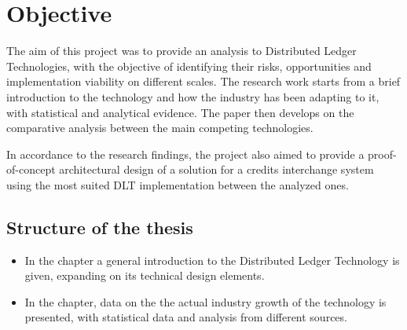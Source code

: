 
\newpage

\mbox{}\vfill
\chapter*{\centering Objective}

The aim of this project was to provide an analysis to Distributed Ledger Technologies, with the objective of identifying their risks, opportunities and implementation viability on different scales. The research work starts from a brief introduction to the technology and how the industry has been adapting to it, with statistical and analytical evidence. The paper then develops on the comparative analysis between the main competing technologies.

In accordance to the research findings, the project also aimed to provide a proof-of-concept architectural design of a solution for a credits interchange system using the most suited DLT implementation between the analyzed ones.

\section*{Structure of the thesis}

\begin{itemize}

    \item In the  chapter a general introduction to the Distributed Ledger Technology is given, expanding on its technical design elements.

    \item In the  chapter, data on the the actual industry growth of the technology is presented, with statistical data and analysis from different sources.

\end{itemize}

\mbox{}\vfill